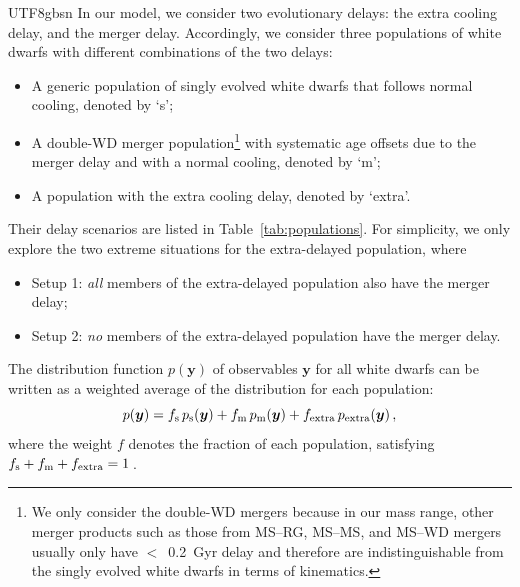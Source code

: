 \documentclass[twocolumn, times, trackchanges]{aastex63_bren}
\newcommand{\mathbfit}{\bm}
\begin{document}
\begin{CJK*}{UTF8}{gbsn}
In our model, we consider two evolutionary delays: the extra cooling delay, and the merger delay. Accordingly, we consider three populations of white dwarfs with different combinations of the two delays:
\begin{itemize}
    \item A generic population of singly evolved white dwarfs that follows normal cooling, denoted by `s';
    \item A double-WD merger population\footnote{We only consider the double-WD mergers because in our mass range, other merger products such as those from MS--RG, MS--MS, and MS--WD mergers usually only have $<$~0.2~Gyr delay and therefore are indistinguishable from the singly evolved white dwarfs in terms of kinematics.} with systematic age offsets due to the merger delay and with a normal cooling, denoted by `m';
    \item A population with the extra cooling delay, denoted by `extra'.
\end{itemize}
Their delay scenarios are listed in Table~\ref{tab:populations}.
For simplicity, we only explore the two extreme situations for the extra-delayed population, where
\begin{itemize}
    \item Setup 1: \emph{all} members of the extra-delayed population also have the merger delay;
    \item Setup 2: \emph{no} members of the extra-delayed population have the merger delay.
\end{itemize}
The distribution function $p(\mathbfit{y})$ of observables $\mathbfit{y}$ for all white dwarfs can be written as a weighted average of the distribution for each population:
\begin{equation}
\label{eq:components}
    p(\mathbfit{y}) = f_{\rm s}\,p_{\rm s}(\mathbfit{y}) + f_\text{m}\,p_{\rm m}(\mathbfit{y}) + f_\text{extra}\,p_{\rm extra}(\mathbfit{y})\,,
\end{equation}
where the weight $f$ denotes the fraction of each population, satisfying $ f_{\rm s} + f_\text{m} + f_\text{extra}= 1\,$.


\end{CJK*}
\end{document}
